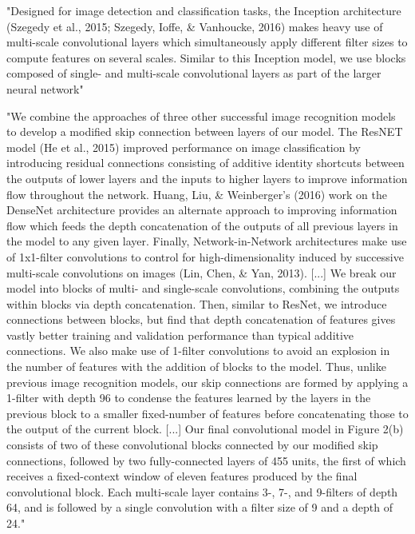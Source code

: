 \documentclass[]{scrartcl}
\begin{document}
"Designed for image detection and classification tasks, the Inception architecture (Szegedy et al., 2015; Szegedy, Ioffe, \& Vanhoucke, 2016) makes heavy use of multi-scale convolutional layers which simultaneously apply different filter sizes to compute features on several scales. Similar to this Inception model, we use blocks composed of single- and multi-scale convolutional layers as part of the larger neural network" \cite{Busia2017}

"We combine the approaches of three other successful image recognition models to develop a modified skip connection between layers of our model. The ResNET model (He et al., 2015) improved performance on image classification by introducing residual connections consisting of additive identity shortcuts between the outputs of lower layers and the inputs to higher layers to improve information flow throughout the network. Huang, Liu, \& Weinberger’s (2016) work on the DenseNet architecture provides an alternate approach to improving information flow which feeds the depth concatenation of the outputs of all previous layers in the model to any given layer. Finally, Network-in-Network architectures make use of 1x1-filter convolutions to control for high-dimensionality induced by successive multi-scale convolutions on images (Lin, Chen, \& Yan, 2013). [...] We break our model into blocks of multi- and single-scale convolutions, combining the outputs within blocks via depth concatenation. Then, similar to ResNet, we introduce connections between blocks, but find that depth concatenation of features gives vastly better training and validation performance than typical additive connections. We also make use of 1-filter convolutions to avoid an explosion in the number of features with the addition of blocks to the model. Thus, unlike previous image recognition models, our skip connections are formed by applying a 1-filter with depth 96 to condense the features learned by the layers in the previous block to a smaller fixed-number of features before concatenating those to the output of the current block. [...] Our final convolutional model in Figure 2(b) consists of two of these convolutional blocks connected by our modified skip connections, followed by two fully-connected layers of 455 units, the first of which receives a fixed-context window of eleven features produced by the final convolutional block. Each multi-scale layer contains 3-, 7-, and 9-filters of depth 64, and is followed by a single convolution with a filter size of 9 and a depth of 24." \cite{Busia2017}
\end{document}
